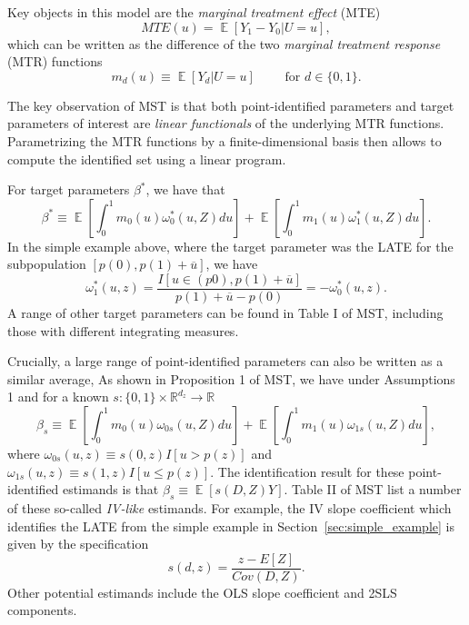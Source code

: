 \documentclass[12pt,a4paper,english]{article} %
\DeclareMathOperator*{\E}{\mathbb{E}}
\numberwithin{equation}{section}
\theoremstyle{definition}
\theoremstyle{remark}
\theoremstyle{plain}
\begin{document}
Key objects in this model are the \textit{marginal treatment effect} (MTE)
\begin{equation}\label{eq:mte}
  MTE(u) = \E[Y_1 - Y_0|U=u],
\end{equation}
which can be written as the difference of the two \textit{marginal treatment response} (MTR) functions
\begin{equation}\label{eq:mtr}
  m_d(u) \equiv \E[Y_d|U=u] \qquad \text{ for } d\in\{0,1\}.
\end{equation}

The key observation of MST is that both point-identified parameters and target parameters of interest are \textit{linear functionals} of the underlying MTR functions.
Parametrizing the MTR functions by a finite-dimensional basis then allows to compute the identified set using a linear program.

For target parameters $\beta^*$, we have that
\begin{equation}\label{eq:target}
  \beta^* \equiv \E\left[\int_0^1m_0(u)\omega^*_0(u,Z)du\right] + \E\left[\int_0^1m_1(u)\omega^*_1(u,Z)du\right].
\end{equation}
In the simple example above, where the target parameter was the LATE for the subpopulation $[p(0), p(1) + \overline{u}]$, we have
\begin{equation*}
  \omega^*_1(u, z) = \frac{I[u\in(p0), p(1) + \overline{u}]}{p(1) + \overline{u} - p(0)} = -\omega^*_0(u,z).
\end{equation*}
A range of other target parameters can be found in Table I of MST, including those with different integrating measures.

Crucially, a large range of point-identified parameters can also be written as a similar average,
As shown in Proposition 1 of MST, we have under Assumptions 1 and for a known $s: \{0,1\}\times \mathbb{R}^{d_z} \to \mathbb{R}$
\begin{equation}\label{eq:identified_s}
  \beta_s \equiv \E\left[\int_0^1m_0(u)\omega_{0s}(u,Z)du\right] + \E\left[\int_0^1m_1(u)\omega_{1s}(u,Z)du\right],
\end{equation}
where $\omega_{0s}(u,z) \equiv s(0, z)I[u > p(z)]$ and $\omega_{1s}(u,z) \equiv s(1,z) I[u\leq p(z)]$.
The identification result for these point-identified estimands is that $\beta_s \equiv \E[s(D,Z)Y]$.
Table II of MST list a number of these so-called \textit{IV-like} estimands.
For example, the IV slope coefficient which identifies the LATE from the simple example in Section~\ref{sec:simple_example} is given by the specification
\begin{equation*}
  s(d,z) = \frac{z - E[Z]}{Cov(D,Z)}.
\end{equation*}
Other potential estimands include the OLS slope coefficient and 2SLS components.
\end{document}
